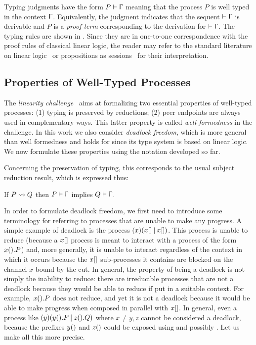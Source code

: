 Typing judgments have the form $\wtp{P}\Context$ meaning that the process $P$ is
well typed in the context $\Upgamma$. Equivalently, the judgment indicates that
the sequent $\wtp{}\Context$ is derivable and $P$ is a \emph{proof term}
corresponding to the derivation for $\wtp{}\Context$.
%
The typing rules are shown in . Since they are in
one-to-one correspondence with the proof rules of classical linear logic, the
reader may refer to the standard literature on linear logic~\cite{} or
propositions as sessions~\citep{Wadler14} for their interpretation.

\subsection{Properties of Well-Typed Processes}
\label{sec:properties}

The \emph{linearity challenge}~\citep{CarboneEtAl24} aims at formalizing two
essential properties of well-typed processes: (1) typing is preserved by
reductions; (2) peer endpoints are always used in complementary ways. This
latter property is called \emph{well formedness} in the challenge. In this work
we also consider \emph{deadlock freedom}, which is more general than well
formedness and holds for \Calculus since its type system is based on linear
logic. We now formulate these properties using the notation developed so far.

Concerning the preservation of typing, this corresponds to the usual subject
reduction result, which is expressed thus:

\begin{theorem}
    \label{thm:red}
    If $P \leadsto Q$ then $\wtp{P}\Context$ implies $\wtp{Q}\Context$.
\end{theorem}

In order to formulate deadlock freedom, we first need to introduce some
terminology for referring to processes that are unable to make any progress. A
simple example of deadlock is the process $(x)(x[]\mathbin|x[])$. This
process is unable to reduce (because a $x[]$ process is meant to interact
with a process of the form $x().P$) and, more generally, it is unable to
interact regardless of the context in which it occurs because the $x[]$
sub-processes it contains are blocked on the channel $x$ bound by the cut.
%
In general, the property of being a deadlock is not simply the inability to
reduce: there are irreducible processes that are not a deadlock because they
would be able to reduce if put in a suitable context. For example, $x().P$
does not reduce, and yet it is not a deadlock because it would be able to make
progress when composed in parallel with $x[]$. In general, even a process
like $(y)(y().P\mathbin|z().Q)$ where $x\ne y,z$ cannot be considered a
deadlock, because the prefixes $y()$ and $z()$ could be exposed using
\SWait and possibly \SComm. Let us make all this more precise.

